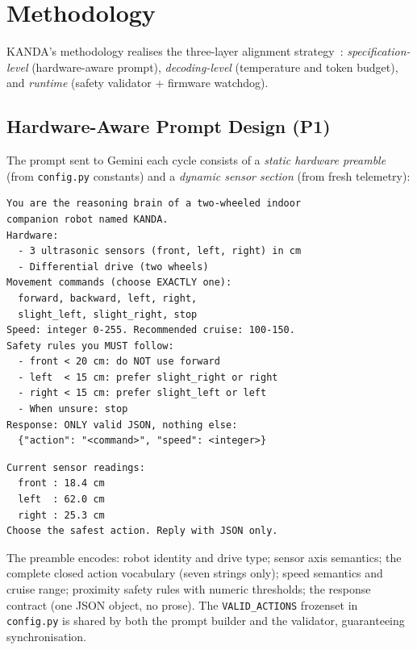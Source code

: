 \documentclass[conference]{IEEEtran}
\begin{document}
\section{Methodology}
\label{sec:methodology}

KANDA's methodology realises the three-layer alignment
strategy~\cite{huang2023grounded}: \emph{specification-level} (hardware-aware
prompt), \emph{decoding-level} (temperature and token budget), and
\emph{runtime} (safety validator + firmware watchdog).

\subsection{Hardware-Aware Prompt Design (P1)}
\label{sec:prompt}

The prompt sent to Gemini each cycle consists of a \emph{static hardware
preamble} (from \texttt{config.py} constants) and a \emph{dynamic sensor
section} (from fresh telemetry):

\begin{lstlisting}[caption={Static preamble (context\_builder.py excerpt)}]
You are the reasoning brain of a two-wheeled indoor
companion robot named KANDA.
Hardware:
  - 3 ultrasonic sensors (front, left, right) in cm
  - Differential drive (two wheels)
Movement commands (choose EXACTLY one):
  forward, backward, left, right,
  slight_left, slight_right, stop
Speed: integer 0-255. Recommended cruise: 100-150.
Safety rules you MUST follow:
  - front < 20 cm: do NOT use forward
  - left  < 15 cm: prefer slight_right or right
  - right < 15 cm: prefer slight_left or left
  - When unsure: stop
Response: ONLY valid JSON, nothing else:
  {"action": "<command>", "speed": <integer>}
\end{lstlisting}

\begin{lstlisting}[caption={Dynamic sensor section appended each cycle}]
Current sensor readings:
  front : 18.4 cm
  left  : 62.0 cm
  right : 25.3 cm
Choose the safest action. Reply with JSON only.
\end{lstlisting}

The preamble encodes: robot identity and drive type; sensor axis semantics;
the complete closed action vocabulary (seven strings only); speed semantics
and cruise range; proximity safety rules with numeric thresholds; the response
contract (one JSON object, no prose).
The \texttt{VALID\_ACTIONS} frozenset in \texttt{config.py} is shared by
both the prompt builder and the validator, guaranteeing synchronisation.
\end{document}
